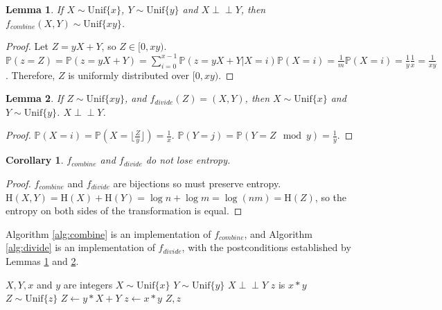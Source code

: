\documentclass[lettersize,journal]{IEEEtran}
\newtheorem{lemma}{Lemma}
\newtheorem{corollary}{Corollary}
\newcommand{\indep}{\perp\!\!\!\perp}
\newcommand{\unif}[1]{\mathrm{Unif}\{#1\}}
\newcommand{\Entropy}{\mathrm{H}}
\newcommand{\entropy}[1]{\Entropy(#1)}
\newcommand{\Prob}{\mathbb{P}}
\newcommand{\prob}[1]{\Prob(#1)}
\begin{document}
\begin{lemma}
    If $X \sim \unif{x}$, $Y \sim \unif{y}$ and $X \indep Y$, then 
    $f_{combine}(X,Y) \sim \unif{xy}$.
    \label{lem:combine}
\end{lemma}

\begin{proof}
    Let $Z = yX+Y$, so $Z \in [0,xy)$. $\prob{z=Z} = \prob{z=yX+Y} = \sum_{i=0}^{x-1}\prob{z=yX+Y|X=i}\prob{X=i} = \frac{1}{m}\prob{X=i} = \frac{1}{y}\frac{1}{x} = \frac{1}{xy}$. Therefore, $Z$ is uniformly distributed over $[0,xy)$.
\end{proof}

\begin{lemma}
    If $Z \sim \unif{xy}$, and $f_{divide}(Z) = (X,Y)$, then $X \sim \unif{x}$ and $Y \sim \unif{y}$. $X \indep Y$.
    \label{lem:divide-postconditions}
\end{lemma}

\begin{proof}
    $\prob{X=i} = \prob{X = \lfloor \frac{Z}{y}\rfloor} = \frac{1}{x}$. $\prob{Y=j} = \prob{Y = Z \mod y} = \frac{1}{y}$.
\end{proof}

\begin{corollary}
    $f_{combine}$ and $f_{divide}$ do not lose entropy.
    \label{cor:combine-entropy}
\end{corollary}

\begin{proof}$f_{combine}$ and $f_{divide}$ are bijections so must preserve entropy. $\entropy{X,Y} = \entropy{X} + \entropy{Y} = \log{n} + \log{m} = \log(nm) = \entropy{Z}$, so the entropy on both sides of the transformation is equal.
\end{proof}

Algorithm \ref{alg:combine} is an implementation of $f_{combine}$, and Algorithm \ref{alg:divide} is an implementation of $f_{divide}$, with the postconditions established by Lemmas \ref{lem:combine} and \ref{lem:divide-postconditions}.

\begin{algorithm}
\caption{Combining two uniform variables into one uniform variable}
\label{alg:combine}
\begin{algorithmic}[1]
    \Require $X, Y, x$ and $y$ are integers
    \Require $X \sim \unif{x}$
    \Require $Y \sim \unif{y}$
    \Require $X \indep Y$
    \Ensure $z$ is $x * y$
    \Ensure $Z \sim \unif{z}$
  \State $Z \gets y * X + Y$
  \State $z \gets x * y$
  \State \Return $Z, z$
\EndProcedure
\end{algorithmic}
\end{algorithm}
\end{document}
